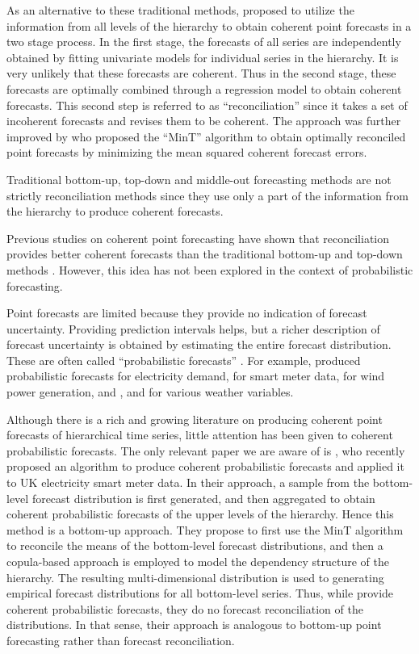 \documentclass[a4paper, 11pt]{article}
\theoremstyle{theo}
\theoremstyle{definition}
\begin{document}
As an alternative to these traditional methods, \citet{Hyndman2011} proposed to utilize the information from all levels of the hierarchy to obtain coherent point forecasts in  a two stage process. In the first stage, the forecasts of all series are independently obtained by fitting univariate models for individual series in the hierarchy. It is very unlikely that these forecasts are coherent. Thus in the second stage, these forecasts are optimally combined through a regression model to obtain coherent forecasts. This second step is referred to as ``reconciliation'' since it takes a set of incoherent forecasts and revises them to be coherent. The approach was further improved by \citet{Wickramasuriya2017} who proposed the ``MinT'' algorithm to obtain optimally reconciled point forecasts by minimizing the mean squared coherent forecast errors. 

Traditional bottom-up, top-down and middle-out forecasting methods are not strictly reconciliation methods since they use only a part of the information from the hierarchy to produce coherent forecasts. 

Previous studies on coherent point forecasting have shown that reconciliation provides better coherent forecasts than the traditional bottom-up and top-down methods \citep{Hyndman2011,VanErven2015a,Wickramasuriya2017}. However, this idea has not been explored in the context of probabilistic forecasting. 

Point forecasts are limited because they provide no indication of forecast uncertainty. Providing prediction intervals helps, but a richer description of forecast uncertainty is obtained by estimating the entire forecast distribution. These are often called ``probabilistic forecasts'' \citep{Gneiting2014}. For example, \citet{McSharry2005} produced probabilistic forecasts for electricity demand, \citet{BenTaieb2017} for smart meter data, \citet{Pinson2009} for wind power generation, and \citet{Gel2004}, \citet{Gneiting2005a} and \citet{Gneiting2005} for various weather variables.

Although there is a rich and growing literature on producing coherent point forecasts of hierarchical time series, little  attention has been given to coherent probabilistic forecasts. The only relevant paper we are aware of is \citet{BenTaieb2017}, who recently proposed an algorithm to produce coherent probabilistic forecasts and applied it to UK electricity smart meter data. In their approach, a sample from the bottom-level forecast distribution is first generated, and then aggregated to obtain coherent probabilistic forecasts of the upper levels of the hierarchy. Hence this method is a bottom-up approach. They propose to first use the MinT algorithm to reconcile the means of the bottom-level forecast distributions, and then a copula-based approach is employed to model the dependency structure of the hierarchy. The resulting multi-dimensional distribution is used to generating empirical forecast distributions for all bottom-level series. Thus, while \citet{BenTaieb2017} provide coherent probabilistic forecasts, they do no forecast reconciliation of the distributions. In that sense, their approach is analogous to bottom-up point forecasting rather than forecast reconciliation.
\end{document}
